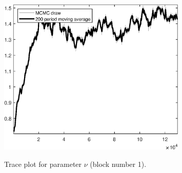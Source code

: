 \begin{figure}[H]
\centering
  \includegraphics[width=0.8\textwidth]{BRS_sectoral_wo_fixed_cost/graphs/TracePlot_nu_blck_1}\\
    \caption{Trace plot for parameter $\nu$ (block number 1).}
\end{figure}
